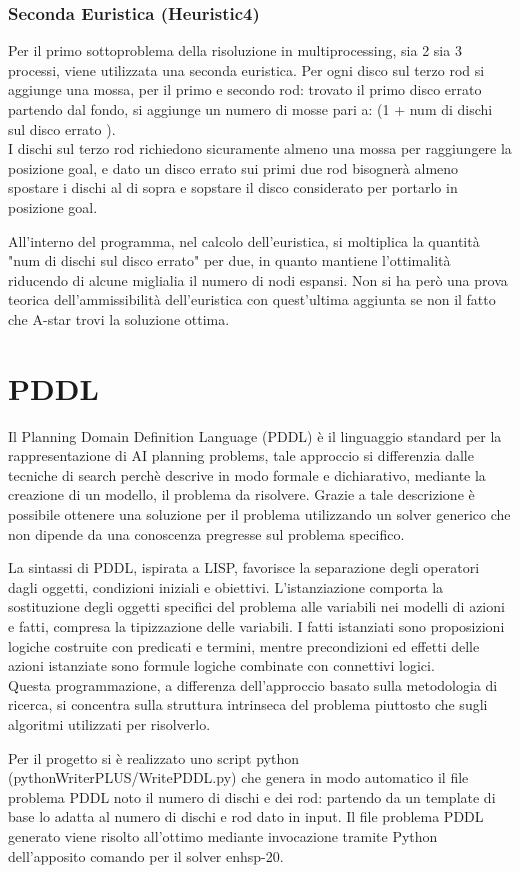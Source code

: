 \documentclass{article}
\begin{document}
\subsubsection*{Seconda Euristica (Heuristic4)}
\label{e4}
Per il primo sottoproblema della risoluzione in multiprocessing, sia 2 sia 3 processi, viene utilizzata una seconda euristica. Per ogni disco sul terzo rod 
si aggiunge una mossa, per il primo e secondo rod: trovato il primo disco errato partendo dal fondo, si aggiunge un numero di mosse pari a: 
(1 + num di dischi sul disco errato ).\\I dischi sul terzo rod richiedono sicuramente almeno una mossa per raggiungere la posizione goal, e
dato un disco errato sui primi due rod bisognerà almeno spostare i dischi al di sopra e sopstare il disco considerato per portarlo in posizione goal.\par
All'interno del programma, nel calcolo dell'euristica, si moltiplica la quantità "num di dischi sul disco errato" per due, in quanto mantiene l'ottimalità
riducendo di alcune miglialia il numero di nodi espansi. Non si ha però una prova teorica dell'ammissibilità dell'euristica con quest'ultima aggiunta
se non il fatto che A-star trovi la soluzione ottima.

\section{PDDL}

Il Planning Domain Definition Language (PDDL) è il linguaggio standard per la rappresentazione di AI planning problems, tale approccio si differenzia dalle tecniche di
search perchè descrive in modo formale e dichiarativo, mediante la creazione di un modello, il problema da risolvere. Grazie a tale descrizione è possibile ottenere
una soluzione per il problema utilizzando un solver generico che non dipende da una conoscenza pregresse sul problema specifico.
\par
La sintassi di PDDL, ispirata a LISP, favorisce la separazione degli operatori dagli oggetti, condizioni iniziali e obiettivi.
L'istanziazione comporta la sostituzione degli oggetti specifici del problema alle variabili nei modelli di azioni e fatti, compresa la tipizzazione delle variabili. 
I fatti istanziati sono proposizioni logiche costruite con predicati e termini, mentre precondizioni ed effetti delle azioni istanziate sono formule logiche combinate 
con connettivi logici.
\\
Questa programmazione, a differenza dell'approccio basato sulla metodologia di ricerca, si concentra sulla struttura intrinseca del problema piuttosto che sugli algoritmi 
utilizzati per risolverlo.
\par 
Per il progetto si è realizzato uno script python (pythonWriterPLUS/WritePDDL.py) che genera in modo automatico il file problema PDDL noto il numero di dischi e dei rod: partendo da un template di base lo adatta al numero di dischi e rod dato in input. 
Il file problema PDDL generato viene risolto all'ottimo mediante invocazione tramite Python dell'apposito comando per il solver enhsp-20. 
\end{document}
